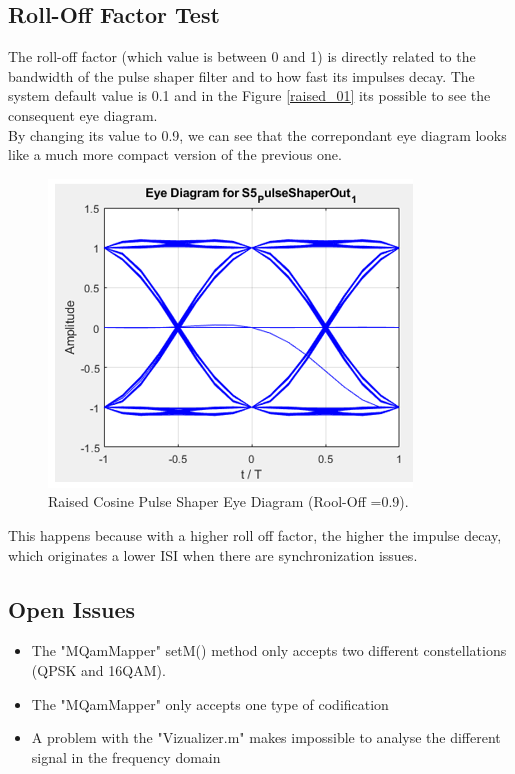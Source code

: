 \subsection*{Roll-Off Factor Test}
The roll-off factor (which value is between 0 and 1) is directly related to the bandwidth of the pulse shaper filter and to how fast its impulses decay. The system default value is 0.1 and in the Figure \ref{raised_01} its possible to see the consequent eye diagram.\\
By changing its value to 0.9, we can see that the correpondant eye diagram looks like a much more compact version of the previous one.
\begin{figure}[H]
	\centering
	\includegraphics[scale=0.75]{./lib/m_qam_transmitter/figures/raised_09}
	\caption{Raised Cosine Pulse Shaper Eye Diagram (Rool-Off =0.9).}\label{raised_09}
\end{figure}
This happens because with a higher roll off factor, the higher the impulse decay, which originates a lower ISI when there are synchronization issues.

\subsection*{Open Issues}
\begin{itemize}
\item The "MQamMapper" setM() method only accepts two different constellations (QPSK and 16QAM).
\item The "MQamMapper" only accepts one type of codification
\item A problem with the "Vizualizer.m" makes impossible to analyse the different signal in the frequency domain\\
\end{itemize}

